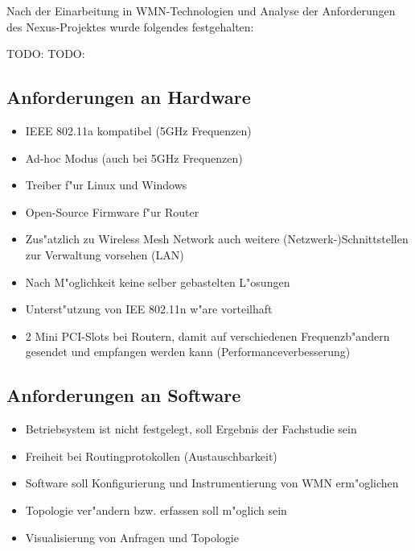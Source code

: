 Nach der Einarbeitung in WMN-Technologien und 
Analyse der Anforderungen des Nexus-Projektes
wurde folgendes festgehalten:

TODO: 
TODO: 
\subsection{Anforderungen an Hardware}
\begin{itemize}
	\item IEEE 802.11a kompatibel (5GHz Frequenzen) 
	\item Ad-hoc Modus (auch bei 5GHz Frequenzen) 
	\item Treiber f"ur Linux und Windows
	\item Open-Source Firmware f"ur Router
	\item Zus"atzlich zu Wireless Mesh Network auch weitere
	(Netzwerk-)Schnittstellen zur Verwaltung vorsehen (LAN)
	\item Nach M"oglichkeit keine selber gebastelten L"osungen 
	\item Unterst"utzung von IEE 802.11n w"are vorteilhaft
	\item 2 Mini PCI-Slots bei Routern, damit auf verschiedenen
	Frequenzb"andern gesendet und empfangen werden kann
	(Performanceverbesserung) 
\end{itemize}

\subsection{Anforderungen an Software}
\begin{itemize}
	\item Betriebsystem ist nicht festgelegt,
	soll Ergebnis der Fachstudie sein
	\item Freiheit bei Routingprotokollen (Austauschbarkeit)
	\item Software soll Konfigurierung und Instrumentierung von WMN
	erm"oglichen
	\item Topologie ver"andern bzw. erfassen soll m"oglich sein
	\item Visualisierung von Anfragen und Topologie 
\end{itemize}

